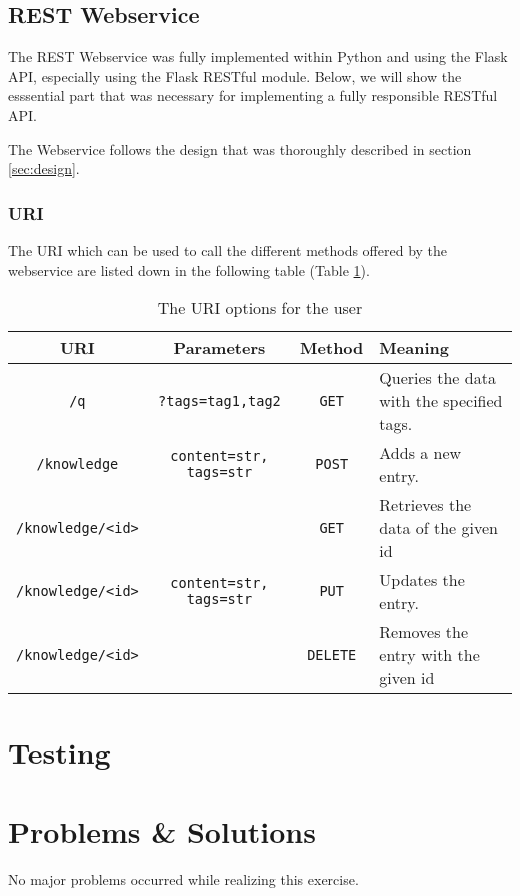 \documentclass[11pt, a4paper]{article}
\begin{document}
\subsection{REST Webservice}

The REST Webservice was fully implemented within Python and using the Flask API,
especially using the Flask RESTful module. Below, we will show the esssential
part that was necessary for implementing a fully responsible RESTful API.  

The Webservice follows the design that was thoroughly described in section
\ref{sec:design}.

\subsubsection{URI}

The URI which can be used to call the different methods offered by the
webservice are listed down in the following table (Table \ref{tab:uri}).

\begin{table}[htbp]
  \centering
  \begin{tabular}{| c | c | c | l | } \hline
    \textbf{URI} & \textbf{Parameters} & \textbf{Method} & \textbf{Meaning} \\ \hline
    \lstinline|/q| & \lstinline|?tags=tag1,tag2| & \lstinline|GET| & Queries the data with the specified tags.  \\ \hline
    \lstinline|/knowledge| & \lstinline|content=str, tags=str| & \lstinline|POST| & Adds a new entry. \\ \hline
    \lstinline|/knowledge/<id>| &  & \lstinline|GET| & Retrieves the data of the given id  \\ \hline
    \lstinline|/knowledge/<id>| & \lstinline|content=str, tags=str| & \lstinline|PUT| & Updates the entry.   \\ \hline
    \lstinline|/knowledge/<id>| &  & \lstinline|DELETE| & Removes the entry with the given id \\ \hline
  \end{tabular}
  \caption{The URI options for the user}
  \label{tab:uri}
\end{table}


\subsection{}

\section{Testing}


\section{Problems \& Solutions}

No major problems occurred while realizing this exercise.

\nocite{*}


\end{document}
